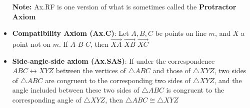 \documentclass{report}
\begin{document}
\begin{itemize}
                    \bigbreak \noindent 
                    \textbf{Note:} Ax.RF is one version of what is sometimes called the \textbf{Protractor Axiom}
                \item \textbf{Compatibility Axiom (Ax.C)}: Let $A,B,C$ be points on line $m$, and $X$ a point not on $m$. If $ A\text{-}B\text{-}C$, then $ \overrightarrow{XA}\text{-}\overrightarrow{XB}\text{-}\overrightarrow{XC} $
        \item \textbf{Side-angle-side axiom (Ax.SAS)}: If under the correspondence $ABC \leftrightarrow XYZ$ between the vertices of $ \triangle ABC$ and those of $ \triangle XYZ$, two sides of $ \triangle ABC$ are congruent to the corresponding two sides of $\triangle XYZ$, and the angle included between these two sides of $ \triangle ABC$ is congruent to the corresponding angle of $\triangle XYZ$, then $\triangle ABC \cong \triangle XYZ$

    \end{itemize}

    \pagebreak 
\end{document}
